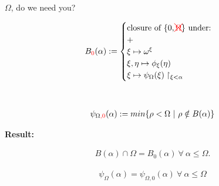 \documentclass{beamer}
\begin{document}
\begin{frame}{$\Omega$, do we need you?}
\centering
\begin{minipage}{0.45\textwidth}
\begin{align*}
		B_{\color{red}{0}}(\alpha) := 
		\begin{cases}
			\text{closure of } \{0,\color{red}\xcancel{\Omega}\color{black}\} \text{ under:} \\
			+ \\
			 \xi \mapsto \omega^\xi \\ 
			 \xi, \eta \mapsto \phi_{\xi}(\eta) \\ 
			\xi \mapsto \psi_{\Omega}(\xi) \upharpoonright_{\xi < \alpha} 
		\end{cases}\\
	\end{align*}
    \end{minipage}\hfill \\
    
    
    \begin{minipage}{0.45\textwidth}
	\begin{align*}
		\psi_{\Omega\color{red},0\color{black}}(\alpha) := min\{ \rho < \Omega \  | \  \rho \notin B(\alpha) \} 
	\end{align*}
    \end{minipage} \pause

 \textbf{Result:} 

\begin{minipage}{0.45\textwidth}
	\begin{align*}
		B(\alpha) \cap \Omega =B_{0}(\alpha)\ \forall\ \alpha \leq \Omega.
	\end{align*}
\end{minipage}\pause



\begin{minipage}{0.45\textwidth}
	\begin{align*}
		\psi_{\Omega}(\alpha)=\psi_{\Omega,0}(\alpha)\ \forall\ \alpha \leq \Omega
	\end{align*}
\end{minipage}

\end{frame}
\end{document}
